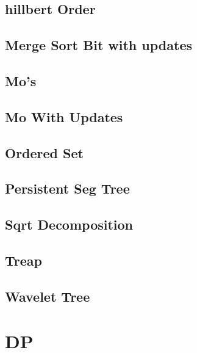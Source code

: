 \subsection{hillbert Order}
\raggedbottom
\hrulefill
\subsection{Merge Sort Bit with updates}
\raggedbottom
\hrulefill
\subsection{Mo's}
\raggedbottom
\hrulefill
\subsection{Mo With Updates}
\raggedbottom
\hrulefill
\subsection{Ordered Set}
\raggedbottom
\hrulefill
\subsection{Persistent Seg Tree}
\raggedbottom
\hrulefill
\subsection{Sqrt Decomposition}
\raggedbottom
\hrulefill
\subsection{Treap}
\raggedbottom
\hrulefill
\subsection{Wavelet Tree}
\raggedbottom
\hrulefill

\section{DP}
